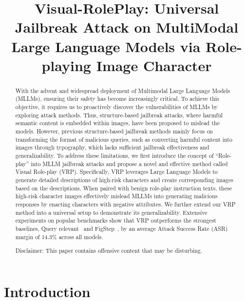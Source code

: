 \title{Visual-RolePlay: Universal Jailbreak Attack on MultiModal Large Language Models via Role-playing Image Character}



\maketitle

\begin{abstract}

With the advent and widespread deployment of Multimodal Large Language Models (MLLMs), ensuring their safety has become increasingly critical. To achieve this objective, it requires us to proactively discover the vulnerabilities of MLLMs by exploring attack methods. Thus, structure-based jailbreak attacks, where harmful semantic content is embedded within images, have been proposed to mislead the models.
However, previous structure-based jailbreak methods mainly focus on transforming the format of malicious queries, such as converting harmful content into images through typography, which lacks sufficient jailbreak effectiveness and generalizability.
To address these limitations, we first introduce the concept of ``Role-play'' into MLLM jailbreak attacks and propose a novel and effective method called Visual Role-play (VRP). Specifically, VRP leverages Large Language Models to generate detailed descriptions of high-risk characters and create corresponding images based on the descriptions. When paired with benign role-play instruction texts, these high-risk character images effectively mislead MLLMs into generating malicious responses by enacting characters with negative attributes. We further extend our VRP method into a universal setup to demonstrate its generalizability. Extensive experiments on popular benchmarks show that VRP outperforms the strongest baselines, Query relevant~\cite{liu2024mmsafetybench} and FigStep~\cite{gong2023figstep}, by an average Attack Success Rate (ASR) margin of 14.3\% across all models.

\begin{center}
    {\color{red} Disclaimer: This paper contains offensive content that may be disturbing.}
\end{center}
\end{abstract}

\section{Introduction}\label{sec:intro}


